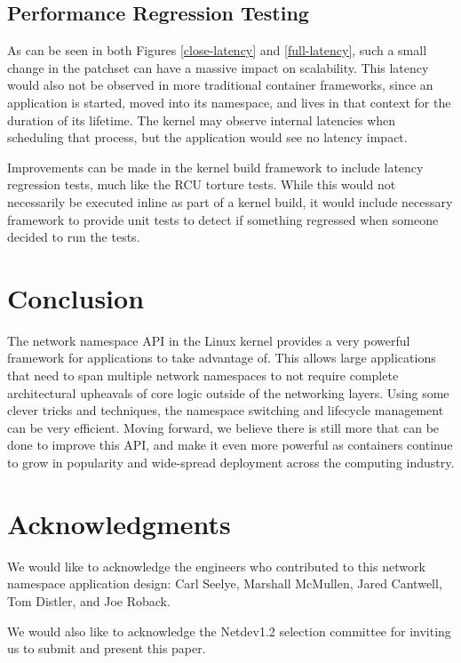 \documentclass[letterpaper]{article}
\begin{document}
\subsection{Performance Regression Testing}
As can be seen in both Figures \ref{close-latency} and \ref{full-latency}, such a small change in the patchset \cite{biederman2014} can have a massive impact on scalability. This latency would also not be observed in more traditional container frameworks, since an application is started, moved into its namespace, and lives in that context for the duration of its lifetime. The kernel may observe internal latencies when scheduling that process, but the application would see no latency impact.

Improvements can be made in the kernel build framework to include latency regression tests, much like the RCU torture tests. While this would not necessarily be executed inline as part of a kernel build, it would include necessary framework to provide unit tests to detect if something regressed when someone decided to run the tests.

\section{Conclusion}
The network namespace API in the Linux kernel provides a very powerful framework for applications to take advantage of. This allows large applications that need to span multiple network namespaces to not require complete architectural upheavals of core logic outside of the networking layers. Using some clever tricks and techniques, the namespace switching and lifecycle management can be very efficient. Moving forward, we believe there is still more that can be done to improve this API, and make it even more powerful as containers continue to grow in popularity and wide-spread deployment across the computing industry.

\section{Acknowledgments}
We would like to acknowledge the engineers who contributed to this network namespace application design: Carl Seelye, Marshall McMullen, Jared Cantwell, Tom Distler, and Joe Roback.

We would also like to acknowledge the Netdev1.2 selection committee for inviting us to submit and present this paper.



\end{document}
